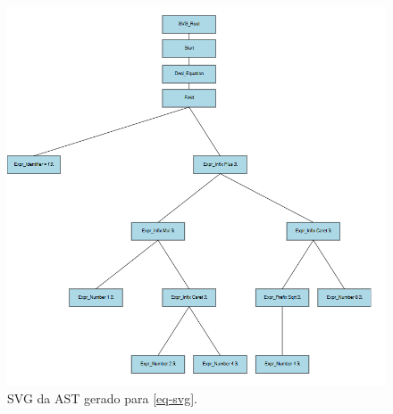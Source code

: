 \begin{figure}[h]
    \caption{\label{fig-svg} \small SVG da AST gerado para \autoref{eq-svg}.}
    \begin{center}
        \includegraphics[scale=0.9]{./Imagens/svg.png}
    \end{center}
\end{figure}



